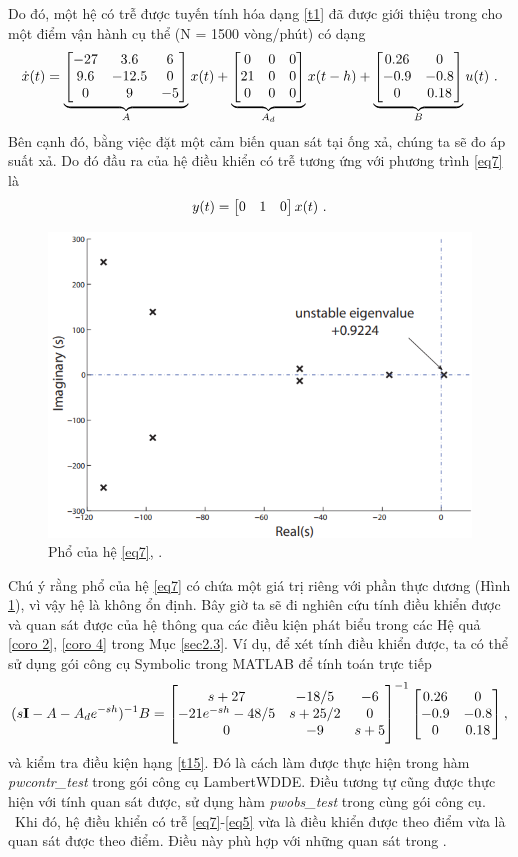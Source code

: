Do đó, một hệ có trễ được tuyến tính hóa dạng \eqref{t1} đã được giới thiệu trong \cite{JanK09} cho một điểm vận hành cụ thể (N = 1500 vòng/phút) có dạng
%
\begin{equation}\label{eq7}
\dot{x}(t) = \underbrace{\begin{bmatrix} -27 & 3.6 & 6 \\ 9.6 & -12.5 & 0 \\ 0 & 9 & -5 \end{bmatrix}}_{A} {x}(t) +   
\underbrace{\begin{bmatrix} 0 & 0 & 0 \\ 21 & 0 & 0 \\0 & 0 & 0  \end{bmatrix}}_{A_d} {x}(t-h) + 
\underbrace{\begin{bmatrix} 0.26 & 0 \\ -0.9 & -0.8 \\ 0 & 0.18 \end{bmatrix}}_{B} {u}(t)  \ .
\end{equation}
%
Bên cạnh đó, bằng việc đặt một cảm biến quan sát tại ống xả, chúng ta sẽ đo áp suất xả. Do đó đầu ra của hệ điều khiển có trễ tương ứng với phương trình \eqref{eq7} là
%
\begin{equation}\label{eq5}
y(t) = \begin{bmatrix} 0 & 1 & 0 \end{bmatrix} x(t) \ .
\end{equation}
%
\begin{figure}[h!]
	\centering
	\includegraphics[width=0.7\linewidth]{hinh/spectrum_diesel}
	\caption{Phổ của hệ \eqref{eq7}, \cite{JanK09}.}
	\label{fig:spectrumdiesel}
\end{figure}
%
Chú ý rằng phổ của hệ \eqref{eq7} có chứa một giá trị riêng với phần thực dương (Hình \ref{fig:spectrumdiesel}), vì vậy hệ là không ổn định.
Bây giờ ta sẽ đi nghiên cứu tính điều khiển được và quan sát được của hệ thông qua các điều kiện phát biểu trong các Hệ quả \ref{coro 2}, \ref{coro 4} trong Mục \ref{sec2.3}. Ví dụ, để xét tính điều khiển được, ta có thể sử dụng gói công cụ Symbolic trong MATLAB để tính toán trực tiếp
%
\begin{equation*}
(s\mathbf{I}-A-A_d e^{-sh})^{-1}B 
= \begin{bmatrix}  s + 27 &    -18/5 &    -6 \\ - 21 e^{-sh} - 48/5 & s + 25/2 &     0 \\ 0 & -9 & s + 5  \end{bmatrix}^{-1} \begin{bmatrix} 0.26 & 0 \\ -0.9 & -0.8 \\ 0 & 0.18 \end{bmatrix}, 
\end{equation*}
%
và kiểm tra điều kiện hạng \eqref{t15}. Đó là cách làm được thực hiện trong hàm \linebreak \emph{pwcontr\_test} trong gói công cụ LambertWDDE.
Điều tương tự cũng được thực hiện với tính quan sát được, sử dụng 
hàm \emph{pwobs\_test} trong cùng gói công cụ. \ 
Khi đó, hệ điều khiển có trễ \eqref{eq7}-\eqref{eq5} vừa là điều khiển được theo điểm vừa là quan sát được theo điểm. Điều này phù hợp với những quan sát trong \cite{JanK09}.

